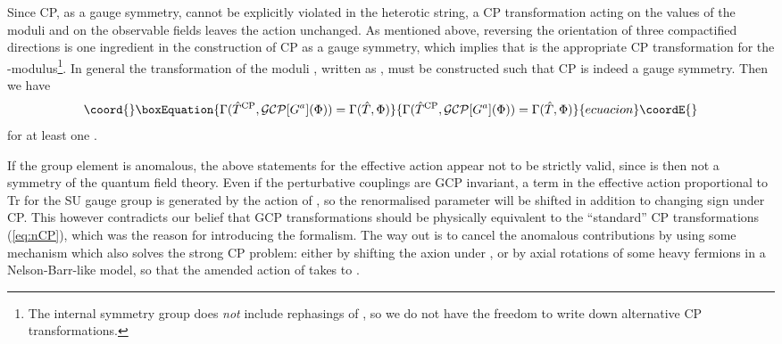 \documentclass[a4paper,12pt]{article}
\begin{document}
Since CP, as a gauge symmetry, cannot be explicitly violated in the heterotic string, a CP transformation acting on the values of the moduli and on the observable fields leaves the action unchanged. As mentioned above, reversing the orientation of three compactified directions is one ingredient in the construction of CP as a gauge symmetry, which implies that \coordHE{} is the appropriate CP transformation for the \coordHE{}-modulus\footnote{The internal symmetry group does {\em not}\/ include rephasings of \coordHE{}, so we do not have the freedom to write down alternative CP transformations.}. In general the transformation of the moduli \coordHE{}, written as \coordHE{}, must be constructed such that CP is indeed a gauge symmetry. Then we have 
\begin{equation}\coord{}\boxEquation{
\Gamma(\hat{T}^{\rm CP}, \mathcal{GCP}[G^a](\Phi)) = \Gamma(\hat{T},\Phi) \label{eq:CPspont}
}{
\Gamma(\hat{T}^{\rm CP}, \mathcal{GCP}[G^a](\Phi)) = \Gamma(\hat{T},\Phi) }{ecuacion}\coordE{}\end{equation}
for at least one \coordHE{}.

If the group element \coordHE{} is anomalous, the above statements for the effective action \myHighlight{$\Gamma$}\coordHE{} appear not to be strictly valid, since \coordHE{} is then not a symmetry of the quantum field theory. Even if the perturbative couplings are GCP invariant, a term in the effective action proportional to Tr\coordHE{} for the SU\coordHE{} gauge group is generated by the action of \coordHE{}, so the renormalised \coordHE{} parameter will be shifted in addition to changing sign under CP. This however contradicts our belief that GCP transformations should be physically equivalent to the ``standard'' CP transformations (\ref{eq:nCP}), which was the reason for introducing the formalism. The way out is to cancel the anomalous contributions by using some mechanism which also solves the strong CP problem: either by shifting the axion under \coordHE{}, or by axial rotations of some heavy fermions in a Nelson-Barr-like model, so that the amended action of \coordHE{} takes \myHighlight{$\bar{\theta}$}\coordHE{} to \myHighlight{$-\bar{\theta}$}\coordHE{}.
\end{document}
